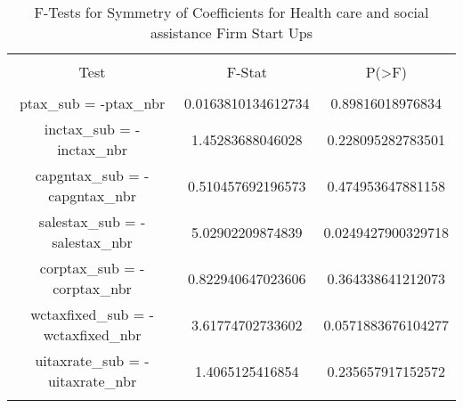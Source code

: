 
\begin{table}[!htbp] \centering 
  \caption{F-Tests for Symmetry of Coefficients for Health care and social assistance Firm Start Ups} 
  \label{} 
\begin{tabular}{@{\extracolsep{5pt}} ccc} 
\\[-1.8ex]\hline 
\hline \\[-1.8ex] 
Test & F-Stat & P(\textgreater F) \\ 
\hline \\[-1.8ex] 
ptax\_sub = -ptax\_nbr & 0.0163810134612734 & 0.89816018976834 \\ 
inctax\_sub = -inctax\_nbr & 1.45283688046028 & 0.228095282783501 \\ 
capgntax\_sub = -capgntax\_nbr & 0.510457692196573 & 0.474953647881158 \\ 
salestax\_sub = -salestax\_nbr & 5.02902209874839 & 0.0249427900329718 \\ 
corptax\_sub = -corptax\_nbr & 0.822940647023606 & 0.364338641212073 \\ 
wctaxfixed\_sub = -wctaxfixed\_nbr & 3.61774702733602 & 0.0571883676104277 \\ 
uitaxrate\_sub = -uitaxrate\_nbr & 1.4065125416854 & 0.235657917152572 \\ 
\hline \\[-1.8ex] 
\end{tabular} 
\end{table} 
